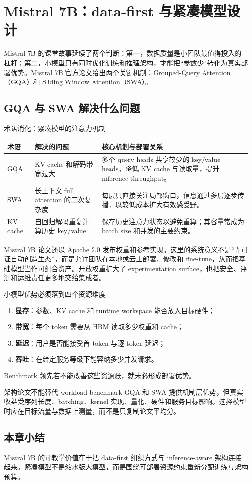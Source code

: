\section{Mistral 7B：data-first 与紧凑模型设计}

Mistral 7B 的课堂故事延续了两个判断：第一，数据质量是小团队最值得投入的杠杆；第二，小模型只有同时优化训练和推理架构，才能把“参数少”转化为真实部署优势。Mistral 7B 官方论文给出两个关键机制：Grouped-Query Attention（GQA）和 Sliding Window Attention（SWA）。

\subsection{GQA 与 SWA 解决什么问题}

\begin{knowledgebox}{术语消化：紧凑模型的注意力机制}
\begin{tabularx}{\textwidth}{L{0.18\textwidth}>{\raggedright\arraybackslash}X>{\raggedright\arraybackslash}X}
\toprule
术语 & 解决的问题 & 核心机制与部署关系 \\
\midrule
GQA & KV cache 和解码带宽过大 & 多个 query heads 共享较少的 key/value heads，降低 KV cache 与读取量，提升 inference throughput。 \\
SWA & 长上下文 full attention 的二次复杂度 & 每层只直接关注局部窗口，信息通过多层逐步传播，以较低成本扩大有效感受野。 \\
KV cache & 自回归解码重复计算历史 key/value & 保存历史注意力状态以避免重算；其容量常成为 batch size 和并发的主要约束。 \\
\bottomrule
\end{tabularx}
\end{knowledgebox}

Mistral 7B 论文还以 Apache 2.0 发布权重和参考实现。这里的系统意义不是“许可证自动创造生态”，而是允许团队在本地或云上部署、修改和 fine-tune，从而把基础模型当作可组合资产。开放权重扩大了 experimentation surface，也把安全、评测和运维责任更多地交给集成者。

\begin{importantbox}{小模型优势必须落到四个资源维度}
\begin{enumerate}
  \item \textbf{显存}：参数、KV cache 和 runtime workspace 能否放入目标硬件；
  \item \textbf{带宽}：每个 token 需要从 HBM 读取多少权重和 cache；
  \item \textbf{延迟}：用户是否能接受首 token 与逐 token 延迟；
  \item \textbf{吞吐}：在给定服务等级下能容纳多少并发请求。
\end{enumerate}
Benchmark 领先若不能改善这些资源账，就未必形成部署优势。
\end{importantbox}

\begin{warningbox}{架构论文不能替代 workload benchmark}
GQA 和 SWA 提供机制层优势，但真实收益受序列长度、batching、kernel 实现、量化、硬件和服务目标影响。选择模型时应在目标流量与数据上测量，而不是只复制论文平均分。
\end{warningbox}

\subsection{本章小结}

Mistral 7B 的可教学价值在于把 data-first 组织方式与 inference-aware 架构连接起来。紧凑模型不是缩水版大模型，而是围绕可部署资源约束重新分配训练与架构预算。


